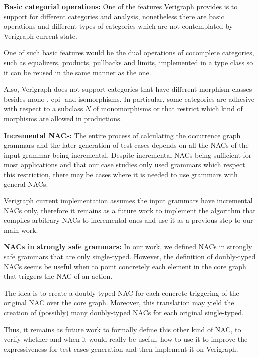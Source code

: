 
\textbf{Basic categorial operations:} One of the features Verigraph provides is to support for different categories and analysis, nonetheless there are basic operations and different types of categories which are not contemplated by Verigraph current state.

One of such basic features would be the dual operations of cocomplete categories, such as equalizers, products, pullbacks and limits, implemented in a  type class so it can be reused in the same manner as the  one.

Also, Verigraph does not support categories that have different morphism classes besides mono-, epi- and isomorphisms. In particular, some categories are adhesive with respect to a subclass $N$ of monomorphisms or that restrict which kind of morphisms are allowed in productions.

\textbf{Incremental NACs:} The entire process of calculating the occurrence graph grammars and the later generation of test cases depends on all the NACs of the input grammar being incremental. Despite incremental NACs being sufficient for most applications and that our case studies only used grammars which respect this restriction, there may be cases where it is needed to use grammars with general NACs.

  Verigraph current implementation assumes the input grammars have incremental NACs only, therefore it remains as a future work to implement the algorithm that compiles arbitrary NACs to incremental ones and use it as a previous step to our main work.

\textbf{NACs in strongly safe grammars:} In our work, we defined NACs in strongly safe grammars that are only single-typed. However, the definition of doubly-typed NACs seems be useful when to point concretely each element in the core graph that triggers the NAC of an action.

The idea is to create a doubly-typed NAC for each concrete triggering of the original NAC over the core graph. Moreover, this translation may yield the creation of (possibly) many doubly-typed NACs for each original single-typed. 

Thus, it remains as future work to formally define this other kind of NAC, to verify whether and when it would really be useful, how to use it to improve the expressiveness for test cases generation and then implement it on Verigraph.

